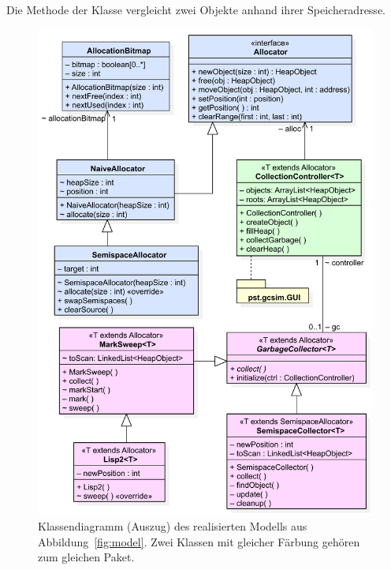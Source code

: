 \begin{listing}[h]
	\inputminted[]{java}{code/AddressComparator.java}
	\caption[Klasse  zum Vergleich von Objekten]{Die Methode  der Klasse  vergleicht zwei Objekte anhand ihrer Speicheradresse.}
	\label{java:comparator}
\end{listing}

\begin{figure}[t!]
	\centering
	\includegraphics[scale=0.6]{img/uml/ch7-klassen.pdf}
	\caption[Klassendiagramm des realisierten Modells (Auszug)]{Klassendiagramm (Auszug) des realisierten Modells aus Abbildung~\ref{fig:model}. Zwei Klassen mit gleicher Färbung gehören zum gleichen Paket.}
	\label{fig:implementation}
\end{figure}


